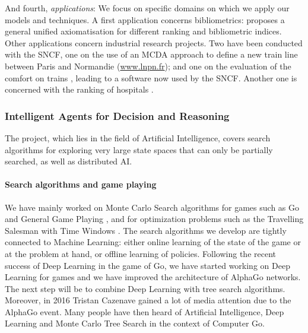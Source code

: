 And fourth, {\em applications}: We focus on specific domains on which we apply our models and techniques. A first application concerns
bibliometrics: \cite{Bouyssou2016Ranking-1123269} proposes a  general unified axiomatisation for different ranking and bibliometric indices. 
Other applications concern industrial research projects. Two have been conducted with the SNCF, one on the use of an MCDA approach to define a new train line between Paris and Normandie (\url{www.lnpn.fr}); and one on 
the evaluation of the comfort on trains \cite{Guerrand2015On-1223042}, leading to a software now used by the SNCF. 
Another one is concerned with the ranking of hospitals \cite{Mayag2016A-1168365}.


\subsubsection{Intelligent Agents for Decision and Reasoning}

The project, which lies in the field of Artificial Intelligence, covers search algorithms for exploring very large state spaces that can only be
partially searched, as well as distributed AI. 

\paragraph{Search algorithms and game playing}

We have mainly worked on Monte Carlo
Search algorithms for games such as Go and General Game Playing \cite{Cazenave2015Generalized-1222829}, and for
optimization problems such as the Travelling Salesman with Time Windows \cite{DBLP:conf/ki/EdelkampC16,Cornu2017Perturbed-1168165}.
The search algorithms we develop are tightly connected to Machine Learning:
either online learning of the state of the game \cite{Cazenave2016Playout-1222820} or at the problem at hand, or offline
learning of policies. Following the recent success of Deep Learning in the game of Go, we have
started working on Deep Learning for games and we have improved the architecture
of AlphaGo networks. The next step will be to combine Deep Learning
with tree search algorithms.
Moreover,  in 2016 Tristan Cazenave gained a lot of media attention due to the AlphaGo event. Many people have then heard of Artificial Intelligence, Deep Learning and Monte Carlo Tree Search in the context of Computer Go.

